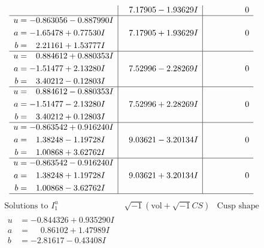 \documentclass[1p]{elsarticle_modified}
\theoremstyle{definition}
\newcommand{\I}{\sqrt{-1}}
\begin{document}
$$\begin{array}{c|c|c}
 & \phantom{-}7.17905 - 1.93629 I & \phantom{-0.000000 } 0 \\ \hline\begin{aligned}
u &= -0.863056 - 0.887990 I \\
a &= -1.65478 + 0.77530 I \\
b &= \phantom{-}2.21161 + 1.53777 I\end{aligned}
 & \phantom{-}7.17905 + 1.93629 I & \phantom{-0.000000 } 0 \\ \hline\begin{aligned}
u &= \phantom{-}0.884612 + 0.880353 I \\
a &= -1.51477 + 2.13280 I \\
b &= \phantom{-}3.40212 - 0.12803 I\end{aligned}
 & \phantom{-}7.52996 - 2.28269 I & \phantom{-0.000000 } 0 \\ \hline\begin{aligned}
u &= \phantom{-}0.884612 - 0.880353 I \\
a &= -1.51477 - 2.13280 I \\
b &= \phantom{-}3.40212 + 0.12803 I\end{aligned}
 & \phantom{-}7.52996 + 2.28269 I & \phantom{-0.000000 } 0 \\ \hline\begin{aligned}
u &= -0.863542 + 0.916240 I \\
a &= \phantom{-}1.38248 - 1.19728 I \\
b &= \phantom{-}1.00868 + 3.62762 I\end{aligned}
 & \phantom{-}9.03621 - 3.20134 I & \phantom{-0.000000 } 0 \\ \hline\begin{aligned}
u &= -0.863542 - 0.916240 I \\
a &= \phantom{-}1.38248 + 1.19728 I \\
b &= \phantom{-}1.00868 - 3.62762 I\end{aligned}
 & \phantom{-}9.03621 + 3.20134 I & \phantom{-0.000000 } 0\\
 \hline 
 \end{array}$$\newpage$$\begin{array}{c|c|c}  
\text{Solutions to }I^u_{1}& \I (\text{vol} + \sqrt{-1}CS) & \text{Cusp shape}\\
 \hline 
\begin{aligned}
u &= -0.844326 + 0.935290 I \\
a &= \phantom{-}0.86102 + 1.47989 I \\
b &= -2.81617 - 0.43408 I\end{aligned}

\end{array}$$
\end{document}
